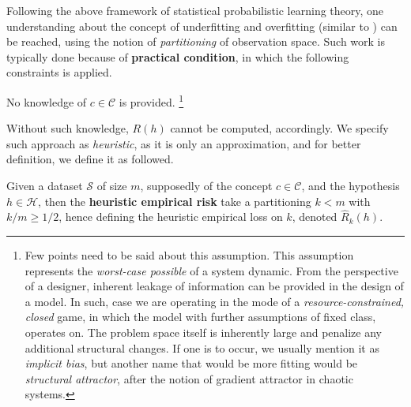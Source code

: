 \documentclass[10pt]{article} %
\begin{document}
Following the above framework of statistical probabilistic learning theory, one understanding about the concept of underfitting and overfitting (similar to \cite{gareth_james_introduction_2013}) can be reached, using the notion of \textit{partitioning} of observation space. Such work is typically done because of \textbf{practical condition}, in which the following constraints is applied.
\begin{assumption}\label{assume:cpi_transparency}
    No knowledge of $c\in\mathcal{C}$ is provided. \footnote{Few points need to be said about this assumption. This assumption represents the \textit{worst-case possible} of a system dynamic. From the perspective of a designer, inherent leakage of information can be provided in the design of a model. In such, case we are operating in the mode of a \textit{resource-constrained, closed} game, in which the model with further assumptions of fixed class, operates on. The problem space itself is inherently large and penalize any additional structural changes. If one is to occur, we usually mention it as \textit{implicit bias}, but another name that would be more fitting would be \textit{structural attractor}, after the notion of gradient attractor in chaotic systems.}
\end{assumption}

Without such knowledge, $R(h)$ cannot be computed, accordingly. We specify such approach as \textit{heuristic}, as it is only an approximation, and for better definition, we define it as followed. 

\begin{definition}
  Given a dataset $\mathcal{S}$ of size $m$, supposedly of the concept $c\in \mathcal{C}$, and the hypothesis $h\in \mathcal{H}$, then the \textbf{heuristic empirical risk} take a partitioning $k<m$ with $k/m\geq 1/2$, hence defining the heuristic empirical loss on $k$, denoted $\hat{R}_{k}(h)$. 
\end{definition}
\end{document}
